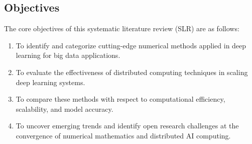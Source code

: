 \subsection{Objectives}

The core objectives of this systematic literature review (SLR) are as follows:

\begin{enumerate}
    \item To identify and categorize cutting-edge numerical methods applied in deep learning for big data applications.
    \item To evaluate the effectiveness of distributed computing techniques in scaling deep learning systems.
    \item To compare these methods with respect to computational efficiency, scalability, and model accuracy.
    \item To uncover emerging trends and identify open research challenges at the convergence of numerical mathematics and distributed AI computing.
\end{enumerate}
